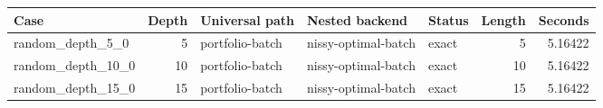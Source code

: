 {\small
\begin{tabular}{lrlllrr}
\hline
Case & Depth & Universal path & Nested backend & Status & Length & Seconds \\
\hline
random\_depth\_5\_0 & 5 & portfolio-batch & nissy-optimal-batch & exact & 5 & 5.16422 \\
random\_depth\_10\_0 & 10 & portfolio-batch & nissy-optimal-batch & exact & 10 & 5.16422 \\
random\_depth\_15\_0 & 15 & portfolio-batch & nissy-optimal-batch & exact & 15 & 5.16422 \\
\hline
\end{tabular}
}

